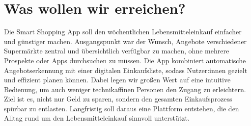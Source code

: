 \section{Was wollen wir erreichen?}
Die Smart Shopping App soll den wöchentlichen Lebensmitteleinkauf einfacher und günstiger machen. Ausgangspunkt war der Wunsch, Angebote verschiedener Supermärkte zentral und übersichtlich verfügbar zu machen, ohne mehrere Prospekte oder Apps durchsuchen zu müssen. Die App kombiniert automatische Angebotserkennung mit einer digitalen Einkaufsliste, sodass Nutzer:innen gezielt und effizient planen können. Dabei legen wir großen Wert auf eine intuitive Bedienung, um auch weniger technikaffinen Personen den Zugang zu erleichtern. Ziel ist es, nicht nur Geld zu sparen, sondern den gesamten Einkaufsprozess spürbar zu entlasten. Langfristig soll daraus eine Plattform entstehen, die den Alltag rund um den Lebensmitteleinkauf sinnvoll unterstützt. 
